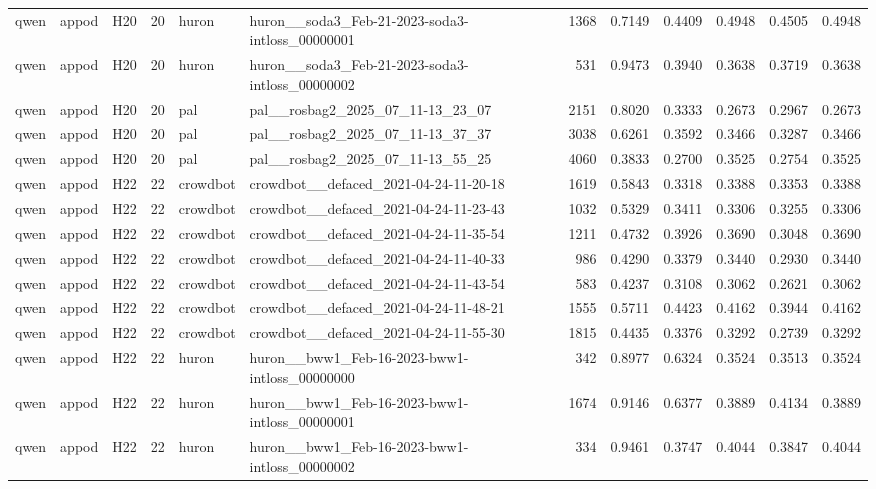 \begin{table}[tbp]
\begin{tabular}{lllrllrrrrrr}
qwen & appod & H20 & 20 & huron & huron\_\_soda3\_Feb-21-2023-soda3-intloss\_00000001 & 1368 & 0.7149 & 0.4409 & 0.4948 & 0.4505 & 0.4948 \\
qwen & appod & H20 & 20 & huron & huron\_\_soda3\_Feb-21-2023-soda3-intloss\_00000002 & 531 & 0.9473 & 0.3940 & 0.3638 & 0.3719 & 0.3638 \\
qwen & appod & H20 & 20 & pal & pal\_\_rosbag2\_2025\_07\_11-13\_23\_07 & 2151 & 0.8020 & 0.3333 & 0.2673 & 0.2967 & 0.2673 \\
qwen & appod & H20 & 20 & pal & pal\_\_rosbag2\_2025\_07\_11-13\_37\_37 & 3038 & 0.6261 & 0.3592 & 0.3466 & 0.3287 & 0.3466 \\
qwen & appod & H20 & 20 & pal & pal\_\_rosbag2\_2025\_07\_11-13\_55\_25 & 4060 & 0.3833 & 0.2700 & 0.3525 & 0.2754 & 0.3525 \\
qwen & appod & H22 & 22 & crowdbot & crowdbot\_\_defaced\_2021-04-24-11-20-18 & 1619 & 0.5843 & 0.3318 & 0.3388 & 0.3353 & 0.3388 \\
qwen & appod & H22 & 22 & crowdbot & crowdbot\_\_defaced\_2021-04-24-11-23-43 & 1032 & 0.5329 & 0.3411 & 0.3306 & 0.3255 & 0.3306 \\
qwen & appod & H22 & 22 & crowdbot & crowdbot\_\_defaced\_2021-04-24-11-35-54 & 1211 & 0.4732 & 0.3926 & 0.3690 & 0.3048 & 0.3690 \\
qwen & appod & H22 & 22 & crowdbot & crowdbot\_\_defaced\_2021-04-24-11-40-33 & 986 & 0.4290 & 0.3379 & 0.3440 & 0.2930 & 0.3440 \\
qwen & appod & H22 & 22 & crowdbot & crowdbot\_\_defaced\_2021-04-24-11-43-54 & 583 & 0.4237 & 0.3108 & 0.3062 & 0.2621 & 0.3062 \\
qwen & appod & H22 & 22 & crowdbot & crowdbot\_\_defaced\_2021-04-24-11-48-21 & 1555 & 0.5711 & 0.4423 & 0.4162 & 0.3944 & 0.4162 \\
qwen & appod & H22 & 22 & crowdbot & crowdbot\_\_defaced\_2021-04-24-11-55-30 & 1815 & 0.4435 & 0.3376 & 0.3292 & 0.2739 & 0.3292 \\
qwen & appod & H22 & 22 & huron & huron\_\_bww1\_Feb-16-2023-bww1-intloss\_00000000 & 342 & 0.8977 & 0.6324 & 0.3524 & 0.3513 & 0.3524 \\
qwen & appod & H22 & 22 & huron & huron\_\_bww1\_Feb-16-2023-bww1-intloss\_00000001 & 1674 & 0.9146 & 0.6377 & 0.3889 & 0.4134 & 0.3889 \\
qwen & appod & H22 & 22 & huron & huron\_\_bww1\_Feb-16-2023-bww1-intloss\_00000002 & 334 & 0.9461 & 0.3747 & 0.4044 & 0.3847 & 0.4044 \\

\end{tabular}
\end{table}
